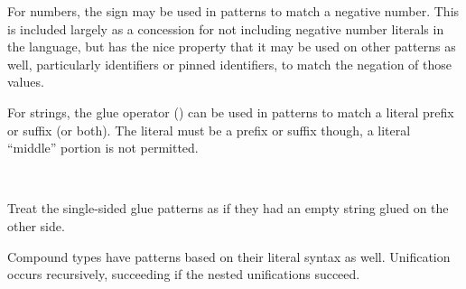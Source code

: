 \begin{bnf*}
\end{bnf*}

For numbers, the \op{-} sign may be used in patterns to match a negative number.
This is included largely as a concession for not including negative number
literals in the language, but has the nice property that it may be used on
other patterns as well, particularly identifiers or pinned identifiers, to
match the negation of those values.

\begin{prooftree}
\end{prooftree}

For strings, the glue operator (\op{<>}) can be used in patterns to match
a literal prefix or suffix (or both). The literal must be a prefix or
suffix though, a literal ``middle'' portion is not permitted.

\begin{bnf*}
     \\
\end{bnf*}

Treat the single-sided glue patterns as if they had an empty string
glued on the other side.

\begin{prooftree}
\end{prooftree}

Compound types have patterns based on their literal syntax as well.
Unification occurs recursively, succeeding if the nested unifications
succeed.

\begin{bnf*}
     \\
     \\
\end{bnf*}


